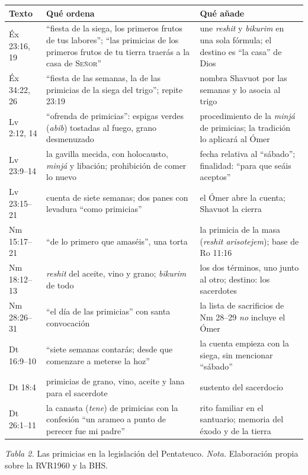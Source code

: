 \documentclass[11pt,letterpaper]{article}
\newcommand{\SENOR}{\textsc{Señor}}
\begin{document}
\begin{center}\begin{minipage}{\linewidth}\centering\footnotesize\renewcommand{\arraystretch}{1.12}
\begin{tabular}{@{}L{2.4cm}L{5.6cm}L{6.4cm}@{}}
\toprule
\textbf{Texto} & \textbf{Qué ordena} & \textbf{Qué añade} \\ \midrule
Éx 23:16, 19 & ``fiesta de la siega, los primeros frutos de tus labores''; ``las primicias de los primeros frutos de tu tierra traerás a la casa de \SENOR'' & une \emph{reshit} y \emph{bikurim} en una sola fórmula; el destino es ``la casa'' de Dios \\
Éx 34:22, 26 & ``fiesta de las semanas, la de las primicias de la siega del trigo''; repite 23:19 & nombra Shavuot por las semanas y lo asocia al trigo \\
Lv 2:12, 14 & ``ofrenda de primicias'': espigas verdes (\emph{abib}) tostadas al fuego, grano desmenuzado & procedimiento de la \emph{minjá} de primicias; la tradición lo aplicará al Ómer \\
Lv 23:9--14 & la gavilla mecida, con holocausto, \emph{minjá} y libación; prohibición de comer lo nuevo & fecha relativa al ``sábado''; finalidad: ``para que seáis aceptos'' \\
Lv 23:15--21 & cuenta de siete semanas; dos panes con levadura ``como primicias'' & el Ómer abre la cuenta; Shavuot la cierra \\
Nm 15:17--21 & ``de lo primero que amaséis'', una torta & la primicia de la masa (\emph{reshit arisotejem}); base de Ro 11:16 \\
Nm 18:12--13 & \emph{reshit} del aceite, vino y grano; \emph{bikurim} de todo & los dos términos, uno junto al otro; destino: los sacerdotes \\
Nm 28:26--31 & ``el día de las primicias'' con santa convocación & la lista de sacrificios de Nm 28--29 \emph{no} incluye el Ómer \\
Dt 16:9--10 & ``siete semanas contarás; desde que comenzare a meterse la hoz'' & la cuenta empieza con la siega, sin mencionar ``sábado'' \\
Dt 18:4 & primicias de grano, vino, aceite y lana para el sacerdote & sustento del sacerdocio \\
Dt 26:1--11 & la canasta (\emph{tene}) de primicias con la confesión ``un arameo a punto de perecer fue mi padre'' & rito familiar en el santuario; memoria del éxodo y de la tierra \\
\bottomrule
\end{tabular}\par
{\footnotesize\color{sepia}\textit{Tabla 2.} Las primicias en la legislación del Pentateuco. \textit{Nota.} Elaboración propia sobre la RVR1960 y la BHS.}
\end{minipage}\end{center}
\end{document}
